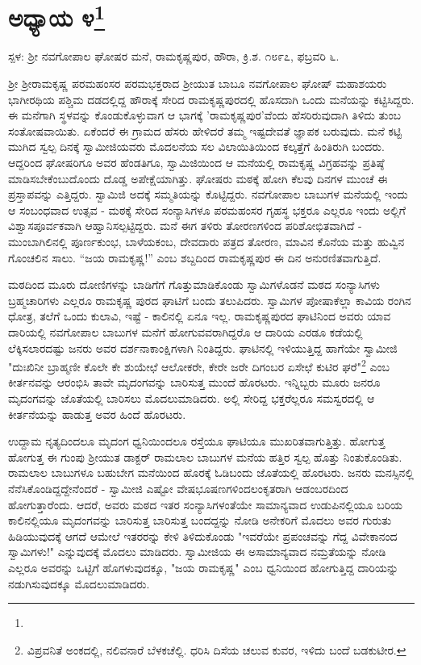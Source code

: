 \newpage

\chapter[ಅಧ್ಯಾಯ ೪]{ಅಧ್ಯಾಯ ೪\protect\footnote{}}

\begin{center}
ಸ್ಪಳ: ಶ‍್ರೀ ನವಗೋಪಾಲ ಘೋಷರ ಮನೆ, ರಾಮಕೃಷ್ಣಪುರ, ಹೌರಾ, ಕ್ರಿ.ಶ. ೧೮೯೭, ಫಬ್ರವರಿ ೬.
\end{center}

ಶ‍್ರೀ ಶ‍್ರೀರಾಮಕೃಷ್ಣ ಪರಮಹಂಸರ ಪರಮಭಕ್ತರಾದ ಶ‍್ರೀಯುತ ಬಾಬೂ ನವಗೋಪಾಲ ಘೋಷ್ ಮಹಾಶಯರು ಭಾಗೀರಥಿಯ ಪಶ್ಚಿಮ ದಡದಲ್ಲಿದ್ದ ಹೌರಾಕ್ಕೆ ಸೇರಿದ ರಾಮಕೃಷ್ಣಪುರದಲ್ಲಿ ಹೊಸದಾಗಿ ಒಂದು ಮನೆಯನ್ನು ಕಟ್ಟಿಸಿದ್ದರು. ಈ ಮನೆಗಾಗಿ ಸ್ಥಳವನ್ನು ಕೊಂಡುಕೊಳ್ಳುವಾಗ ಆ ಭಾಗಕ್ಕೆ 'ರಾಮಕೃಷ್ಣಪುರ'ವೆಂದು ಹೆಸರಿರುವುದಾಗಿ ತಿಳಿದು ತುಂಬ ಸಂತೋಷವಾಯಿತು. ಏಕೆಂದರೆ ಈ ಗ್ರಾಮದ ಹೆಸರು ಹೇಳಿದರೆ ತಮ್ಮ ಇಷ್ಟದೇವತೆ ಜ್ಞಾಪಕ ಬರುವುದು. ಮನೆ ಕಟ್ಟಿ ಮುಗಿದ ಸ್ವಲ್ಪ ದಿನಕ್ಕೆ ಸ್ವಾಮೀಜಿಯವರು ಮೊದಲನೆಯ ಸಲ ವಿಲಾಯಿತಿಯಿಂದ ಕಲ್ಕತ್ತೆಗೆ ಹಿಂತಿರುಗಿ ಬಂದರು. ಆದ್ದರಿಂದ ಘೋಷರಿಗೂ ಅವರ ಹೆಂಡತಿಗೂ, ಸ್ವಾಮಿಜಿಯಿಂದ ಆ ಮನೆಯಲ್ಲಿ ರಾಮಕೃಷ್ಣ ವಿಗ್ರಹವನ್ನು ಪ್ರತಿಷ್ಠೆ ಮಾಡಿಸಬೇಕೆಂಬುದೊಂದು ದೊಡ್ಡ ಅಪೇಕ್ಷೆಯಾಗಿತ್ತು. ಘೋಷರು ಮಠಕ್ಕೆ ಹೋಗಿ ಕೆಲವು ದಿನಗಳ ಮುಂಚೆ ಈ ಪ್ರಸ್ತಾಪವನ್ನು ಎತ್ತಿದ್ದರು. ಸ್ವಾಮಿಜಿ ಅದಕ್ಕೆ ಸಮ್ಮತಿಯನ್ನು ಕೊಟ್ಟಿದ್ದರು. ನವಗೋಪಾಲ ಬಾಬುಗಳ ಮನೆಯಲ್ಲಿ ಇಂದು ಆ ಸಂಬಂಧವಾದ ಉತ್ಸವ - ಮಠಕ್ಕೆ ಸೇರಿದ ಸಂನ್ಯಾಸಿಗಳೂ ಪರಮಹಂಸರ ಗೃಹಸ್ಥ ಭಕ್ತರೂ ಎಲ್ಲರೂ ಇಂದು ಅಲ್ಲಿಗೆ ವಿಶ್ವಾಸಪೂರ್ವಕವಾಗಿ ಆಹ್ವಾನಿಸಲ್ಪಟ್ಟಿದ್ದರು. ಮನೆ ಈಗ ತಳಿರು ತೋರಣಗಳಿಂದ ಪರಿಶೋಭಿತವಾಗಿದೆ - ಮುಂಬಾಗಿಲಿನಲ್ಲಿ ಪೂರ್ಣಕುಂಭ, ಬಾಳೆಯಕಂಬ, ದೇವದಾರು ಪತ್ರದ ತೋರಣ, ಮಾವಿನ ಕೊನೆಯ ಮತ್ತು ಹುವ್ವಿನ ಗೊಂಚಲಿನ ಸಾಲು. “ಜಯ ರಾಮಕೃಷ್ಣ!” ಎಂಬ ಶಬ್ದದಿಂದ ರಾಮಕೃಷ್ಣಪುರ ಈ ದಿನ ಅನುರಣಿತವಾಗುತ್ತಿದೆ.

ಮಠದಿಂದ ಮೂರು ದೋಣಿಗಳನ್ನು ಬಾಡಿಗೆಗೆ ಗೊತ್ತುಮಾಡಿಕೊಂಡು ಸ್ವಾಮಿಗಳೊಡನೆ ಮಠದ ಸಂನ್ಯಾಸಿಗಳು ಬ್ರಹ್ಮಚಾರಿಗಳು ಎಲ್ಲರೂ ರಾಮಕೃಷ್ಣ ಪುರದ ಘಾಟಿಗೆ ಬಂದು ತಲುಪಿದರು. ಸ್ವಾಮಿಗಳ ಪೋಷಾಕೆಲ್ಲಾ ಕಾವಿಯ ರಂಗಿನ ಧೋತ್ರ, ತಲೆಗೆ ಒಂದು ಕುಲಾವಿ, ಇಷ್ಟೆ - ಕಾಲಿನಲ್ಲಿ ಏನೂ ಇಲ್ಲ. ರಾಮಕೃಷ್ಣಪುರದ ಘಾಟಿನಿಂದ ಅವರು ಯಾವ ದಾರಿಯಲ್ಲಿ ನವಗೋಪಾಲ ಬಾಬುಗಳ ಮನೆಗೆ ಹೋಗುವವರಾಗಿದ್ದರೊ ಆ ದಾರಿಯ ಎರಡೂ ಕಡೆಯಲ್ಲಿ ಲೆಕ್ಕಿಸಲಾರದಷ್ಟು ಜನರು ಅವರ ದರ್ಶನಾಕಾಂಕ್ಷಿಗಳಾಗಿ ನಿಂತಿದ್ದರು. ಘಾಟಿನಲ್ಲಿ ಇಳಿಯುತ್ತಿದ್ದ ಹಾಗೆಯೇ ಸ್ವಾಮೀಜಿ "ದುಃಖಿನೀ ಬ್ರಾಹ್ಮಣೀ ಕೊಲೇ ಕೇ ಶುಯೇಛೆ ಆಲೋಕರೇ, ಕೇರೇ ಜರೇ ದಿಗಂಬರ ಏಸೇಛೆ ಕುಟಿರ ಘರೆ"\footnote{ವಿಪ್ರವನಿತೆ ಅಂಕದಲ್ಲಿ, ನಲಿವನಾರೆ ಬೆಳಕಚೆಲ್ಲಿ. ಧರಿಸಿ ದಿಸೆಯ ಚಲುವ ಕುವರ, ಇಳಿದು ಬಂದೆ ಬಡಕುಟೀರ.} ಎಂಬ ಕೀರ್ತನವನ್ನು ಆರಂಭಿಸಿ ತಾವೇ ಮೃದಂಗವನ್ನು ಬಾರಿಸುತ್ತ ಮುಂದೆ ಹೊರಟರು. ಇನ್ನಿಬ್ಬರು ಮೂರು ಜನರೂ ಮೃದಂಗವನ್ನು ಜೊತೆಯಲ್ಲಿ ಬಾರಿಸಲು ಮೊದಲುಮಾಡಿದರು. ಅಲ್ಲಿ ಸೇರಿದ್ದ ಭಕ್ತರೆಲ್ಲರೂ ಸಮಸ್ವರದಲ್ಲಿ ಆ ಕೀರ್ತನೆಯನ್ನು ಹಾಡುತ್ತ ಅವರ ಹಿಂದೆ ಹೊರಟರು.

ಉದ್ದಾಮ ನೃತ್ಯದಿಂದಲೂ ಮೃದಂಗ ಧ್ವನಿಯಿಂದಲೂ ರಸ್ತೆಯೂ ಘಾಟಿಯೂ ಮುಖರಿತವಾಗುತ್ತಿತ್ತು. ಹೋಗುತ್ತ ಹೋಗುತ್ತ ಈ ಗುಂಪು ಶ‍್ರೀಯುತ ಡಾಕ್ಟರ್ ರಾಮಲಾಲ ಬಾಬುಗಳ ಮನೆಯ ಹತ್ತಿರ ಸ್ವಲ್ಪ ಹೊತ್ತು ನಿಂತುಕೊಂಡಿತು. ರಾಮಲಾಲ ಬಾಬುಗಳೂ ಬಹುಬೇಗ ಮನೆಯಿಂದ ಹೊರಕ್ಕೆ ಓಡಿಬಂದು ಜೊತೆಯಲ್ಲಿ ಹೊರಟರು. ಜನರು ಮನಸ್ಸಿನಲ್ಲಿ ನೆನೆಸಿಕೊಂಡಿದ್ದದ್ದೇನೆಂದರೆ - ಸ್ವಾಮೀಜಿ ಎಷ್ಟೋ ವೇಷಭೂಷಣಗಳಿಂದಲಂಕೃತರಾಗಿ ಆಡಂಬರದಿಂದ ಹೋಗುತ್ತಾರೆಂದು. ಆದರೆ, ಅವರು ಮಠದ ಇತರ ಸಂನ್ಯಾಸಿಗಳಂತೆಯೇ ಸಾಮಾನ್ಯವಾದ ಉಡುಪಿನಲ್ಲಿಯೂ ಬರಿಯ ಕಾಲಿನಲ್ಲಿಯೂ ಮೃದಂಗವನ್ನು ಬಾರಿಸುತ್ತ ಬಾರಿಸುತ್ತ ಬಂದದ್ದನ್ನು ನೋಡಿ ಅನೇಕರಿಗೆ ಮೊದಲು ಅವರ ಗುರುತು ಹಿಡಿಯುವುದಕ್ಕೆ ಆಗದೆ ಆಮೇಲೆ ಇತರರನ್ನು ಕೇಳಿ ತಿಳಿದುಕೊಂಡು "ಇವರೆಯೇ ಪ್ರಪಂಚವನ್ನು ಗೆದ್ದ ವಿವೇಕಾನಂದ ಸ್ವಾಮಿಗಳು!" ಎನ್ನುವುದಕ್ಕೆ ಮೊದಲು ಮಾಡಿದರು. ಸ್ವಾಮೀಜಿಯ ಈ ಅಸಾಮಾನ್ಯವಾದ ನಮ್ರತೆಯನ್ನು ನೋಡಿ ಎಲ್ಲರೂ ಅವರನ್ನು ಒಟ್ಟಿಗೆ ಹೊಗಳುವುದಕ್ಕೂ, "ಜಯ ರಾಮಕೃಷ್ಣ" ಎಂಬ ಧ್ವನಿಯಿಂದ ಹೋಗುತ್ತಿದ್ದ ದಾರಿಯನ್ನು ನಡುಗಿಸುವುದಕ್ಕೂ ಮೊದಲುಮಾಡಿದರು.

